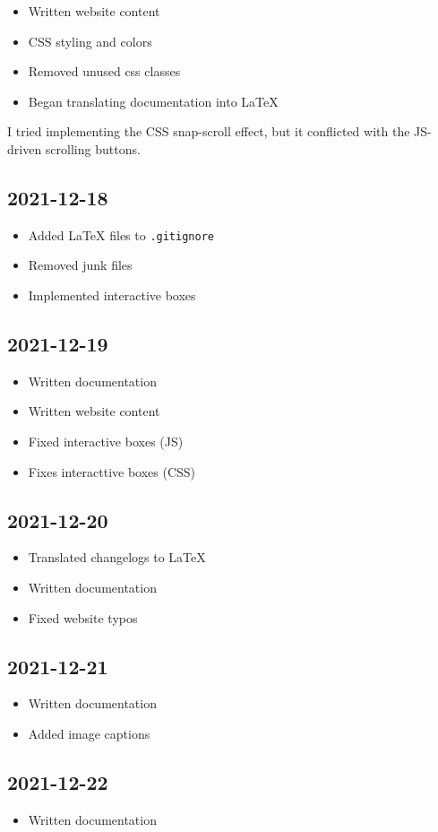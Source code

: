 \documentclass{article}
\begin{document}
\begin{itemize}
    \item Written website content
    \item CSS styling and colors
    \item Removed unused css classes
    \item Began translating documentation into LaTeX
\end{itemize}

I tried implementing the CSS snap-scroll effect,
but it conflicted with the JS-driven scrolling buttons.

\subsection*{2021-12-18}

\begin{itemize}
    \item Added LaTeX files to \texttt{.gitignore}
    \item Removed junk files
    \item Implemented interactive boxes
\end{itemize} %

\subsection*{2021-12-19}

\begin{itemize}
    \item Written documentation
    \item Written website content
    \item Fixed interactive boxes (JS)
    \item Fixes interacttive boxes (CSS)
\end{itemize} %

\subsection*{2021-12-20}

\begin{itemize}
    \item Translated changelogs to LaTeX
    \item Written documentation
    \item Fixed website typos
\end{itemize}

\subsection*{2021-12-21}

\begin{itemize}
    \item Written documentation
    \item Added image captions
\end{itemize}

\subsection*{2021-12-22}

\begin{itemize}
    \item Written documentation
\end{itemize}
\end{document}
